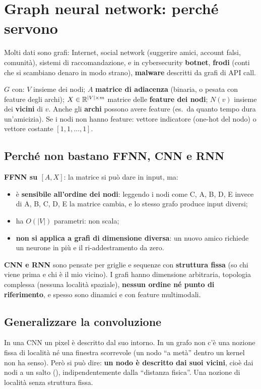 \section{Graph neural network: perché servono}
Molti dati sono grafi: Internet, social network (suggerire amici, account falsi, comunità), sistemi di raccomandazione, e in
cybersecurity \textbf{botnet}, \textbf{frodi} (conti che si scambiano denaro in modo strano), \textbf{malware} descritti da grafi di
API call.

\begin{definizione}[grafo]
$G$ con: $V$ insieme dei nodi; $A$ \textbf{matrice di adiacenza} (binaria, o pesata con feature degli archi);
$X\in\mathbb{R}^{|V|\times m}$ matrice delle \textbf{feature dei nodi}; $N(v)$ insieme dei \textbf{vicini} di $v$.
Anche gli \textbf{archi} possono avere feature (es.\ da quanto tempo dura un'amicizia).
Se i nodi non hanno feature: vettore indicatore (one-hot del nodo) o vettore costante $[1,1,\ldots,1]$.
\end{definizione}

\subsection{Perché non bastano FFNN, CNN e RNN}
\textbf{FFNN su $[A, X]$}: la matrice si può dare in input, ma:
\begin{itemize}
  \item è \textbf{sensibile all'ordine dei nodi}: leggendo i nodi come C, A, B, D, E invece di A, B, C, D, E la matrice cambia, e lo stesso
        grafo produce input diversi;
  \item ha $O(|V|)$ parametri: non scala;
  \item \textbf{non si applica a grafi di dimensione diversa}: un nuovo amico richiede un neurone in più e il ri-addestramento da zero.
\end{itemize}
\textbf{CNN e RNN} sono pensate per griglie e sequenze con \textbf{struttura fissa} (so chi viene prima e chi è il mio vicino). I grafi
hanno dimensione arbitraria, topologia complessa (nessuna località spaziale), \textbf{nessun ordine né punto di riferimento}, e spesso
sono dinamici e con feature multimodali.

\subsection{Generalizzare la convoluzione}
In una CNN un pixel è descritto dal suo intorno. In un grafo non c'è una nozione fissa di località né una finestra scorrevole (un nodo
``a metà'' dentro un kernel non ha senso). Però si può dire: \textbf{un nodo è descritto dai suoi vicini}, cioè dai nodi a un salto
(), indipendentemente dalla ``distanza fisica''. Una nozione di località senza struttura fissa.

